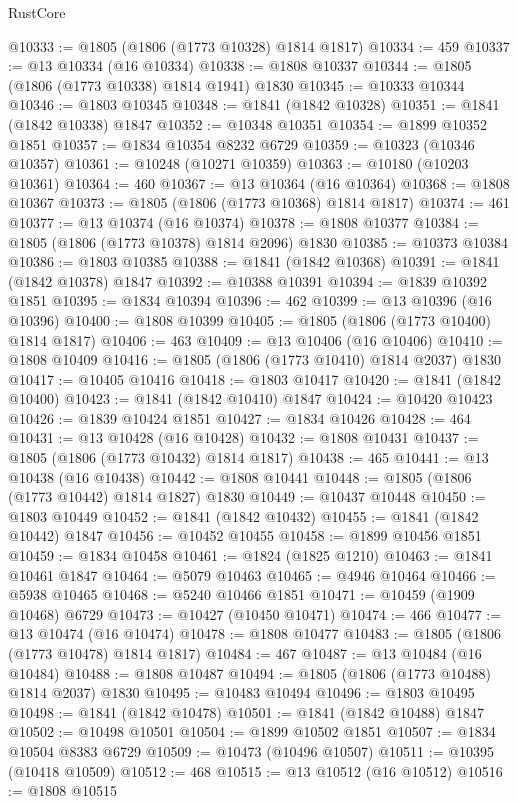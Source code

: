 \begin{lexlean}{RustCore}
\begin{coremodule}
@10333 := @1805 (@1806 (@1773 @10328) @1814 @1817)
@10334 := 459
@10337 := @13 @10334 (@16 @10334)
@10338 := @1808 @10337
@10344 := @1805 (@1806 (@1773 @10338) @1814 @1941) @1830
@10345 := @10333 @10344
@10346 := @1803 @10345
@10348 := @1841 (@1842 @10328)
@10351 := @1841 (@1842 @10338) @1847
@10352 := @10348 @10351
@10354 := @1899 @10352 @1851
@10357 := @1834 @10354 @8232 @6729
@10359 := @10323 (@10346 @10357)
@10361 := @10248 (@10271 @10359)
@10363 := @10180 (@10203 @10361)
@10364 := 460
@10367 := @13 @10364 (@16 @10364)
@10368 := @1808 @10367
@10373 := @1805 (@1806 (@1773 @10368) @1814 @1817)
@10374 := 461
@10377 := @13 @10374 (@16 @10374)
@10378 := @1808 @10377
@10384 := @1805 (@1806 (@1773 @10378) @1814 @2096) @1830
@10385 := @10373 @10384
@10386 := @1803 @10385
@10388 := @1841 (@1842 @10368)
@10391 := @1841 (@1842 @10378) @1847
@10392 := @10388 @10391
@10394 := @1839 @10392 @1851
@10395 := @1834 @10394
@10396 := 462
@10399 := @13 @10396 (@16 @10396)
@10400 := @1808 @10399
@10405 := @1805 (@1806 (@1773 @10400) @1814 @1817)
@10406 := 463
@10409 := @13 @10406 (@16 @10406)
@10410 := @1808 @10409
@10416 := @1805 (@1806 (@1773 @10410) @1814 @2037) @1830
@10417 := @10405 @10416
@10418 := @1803 @10417
@10420 := @1841 (@1842 @10400)
@10423 := @1841 (@1842 @10410) @1847
@10424 := @10420 @10423
@10426 := @1839 @10424 @1851
@10427 := @1834 @10426
@10428 := 464
@10431 := @13 @10428 (@16 @10428)
@10432 := @1808 @10431
@10437 := @1805 (@1806 (@1773 @10432) @1814 @1817)
@10438 := 465
@10441 := @13 @10438 (@16 @10438)
@10442 := @1808 @10441
@10448 := @1805 (@1806 (@1773 @10442) @1814 @1827) @1830
@10449 := @10437 @10448
@10450 := @1803 @10449
@10452 := @1841 (@1842 @10432)
@10455 := @1841 (@1842 @10442) @1847
@10456 := @10452 @10455
@10458 := @1899 @10456 @1851
@10459 := @1834 @10458
@10461 := @1824 (@1825 @1210)
@10463 := @1841 @10461 @1847
@10464 := @5079 @10463
@10465 := @4946 @10464
@10466 := @5938 @10465
@10468 := @5240 @10466 @1851
@10471 := @10459 (@1909 @10468) @6729
@10473 := @10427 (@10450 @10471)
@10474 := 466
@10477 := @13 @10474 (@16 @10474)
@10478 := @1808 @10477
@10483 := @1805 (@1806 (@1773 @10478) @1814 @1817)
@10484 := 467
@10487 := @13 @10484 (@16 @10484)
@10488 := @1808 @10487
@10494 := @1805 (@1806 (@1773 @10488) @1814 @2037) @1830
@10495 := @10483 @10494
@10496 := @1803 @10495
@10498 := @1841 (@1842 @10478)
@10501 := @1841 (@1842 @10488) @1847
@10502 := @10498 @10501
@10504 := @1899 @10502 @1851
@10507 := @1834 @10504 @8383 @6729
@10509 := @10473 (@10496 @10507)
@10511 := @10395 (@10418 @10509)
@10512 := 468
@10515 := @13 @10512 (@16 @10512)
@10516 := @1808 @10515

\end{coremodule}
\end{lexlean}
